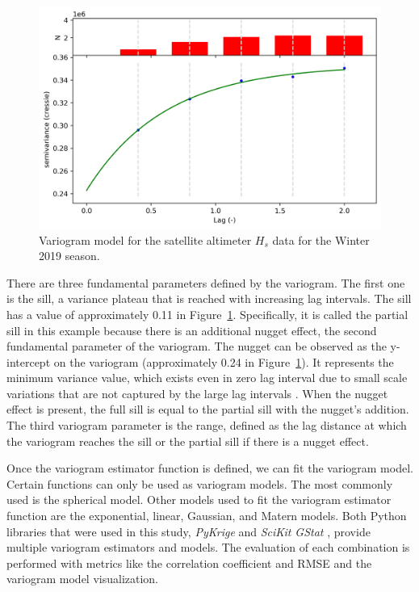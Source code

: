 \begin{figure}[H]
\centering
\includegraphics[width=0.8\linewidth]{Figures/Chapter4/variogram_swh2018.png}
\caption{Variogram model for the satellite altimeter $H_{s}$ data for the Winter 2019 season.}
\label{fig:variogram_model}
\end{figure}


There are three fundamental parameters defined by the variogram. The first one is the sill, a variance plateau that is reached with increasing lag intervals. The sill has a value of approximately 0.11 in Figure~\ref{fig:variogram_model}. Specifically, it is called the partial sill in this example because there is an additional nugget effect, the second fundamental parameter of the variogram. The nugget can be observed as the y-intercept on the variogram (approximately 0.24 in Figure~\ref{fig:variogram_model}). It represents the minimum variance value, which exists even in zero lag interval due to small scale variations that are not captured by the large lag intervals \cite{Trauth2006}. When the nugget effect is present, the full sill is equal to the partial sill with the nugget's addition. The third variogram parameter is the range, defined as the lag distance at which the variogram reaches the sill or the partial sill if there is a nugget effect.  



Once the variogram estimator function is defined, we can fit the variogram model. Certain functions can only be used as variogram models. The most commonly used is the spherical model. Other models used to fit the variogram estimator function are the exponential, linear, Gaussian, and Matern models. Both Python libraries that were used in this study, \emph{PyKrige} \cite{Murphy2020} and \emph{SciKit GStat} \cite{Malicke2020}, provide multiple variogram estimators and models. The evaluation of each combination is performed with metrics like the correlation coefficient and RMSE and the variogram model visualization.

